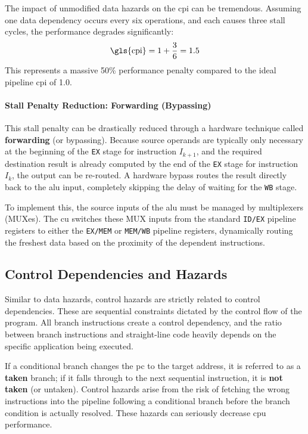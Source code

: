 The impact of unmodified data hazards on the \gls{cpi} can be tremendous. Assuming one data dependency occurs every six operations, and each causes three stall cycles, the performance degrades significantly:
\[
    \text{\gls{cpi}} = 1 + \frac{3}{6} = 1.5
\]
This represents a massive 50\% performance penalty compared to the ideal pipeline \gls{cpi} of 1.0.

\paragraph{Stall Penalty Reduction: Forwarding (Bypassing)} 
This stall penalty can be drastically reduced through a hardware technique called \textbf{forwarding} (or bypassing). Because source operands are typically only necessary at the beginning of the \texttt{EX} stage for instruction \(I_{k+1}\), and the required destination result is already computed by the end of the \texttt{EX} stage for instruction \(I_k\), the output can be re-routed. A hardware bypass routes the result directly back to the \gls{alu} input, completely skipping the delay of waiting for the \texttt{WB} stage.

To implement this, the source inputs of the \gls{alu} must be managed by multiplexers (MUXes). The \gls{cu} switches these MUX inputs from the standard \texttt{ID/EX} pipeline registers to either the \texttt{EX/MEM} or \texttt{MEM/WB} pipeline registers, dynamically routing the freshest data based on the proximity of the dependent instructions.

\subsection{Control Dependencies and Hazards}
Similar to data hazards, control hazards are strictly related to control dependencies. These are sequential constraints dictated by the control flow of the program. All branch instructions create a control dependency, and the ratio between branch instructions and straight-line code heavily depends on the specific application being executed. 

\noindent If a conditional branch changes the \gls{pc} to the target address, it is referred to as a \textbf{taken} branch; if it falls through to the next sequential instruction, it is \textbf{not taken} (or untaken). Control hazards arise from the risk of fetching the wrong instructions into the pipeline following a conditional branch before the branch condition is actually resolved. These hazards can seriously decrease \gls{cpu} performance.

